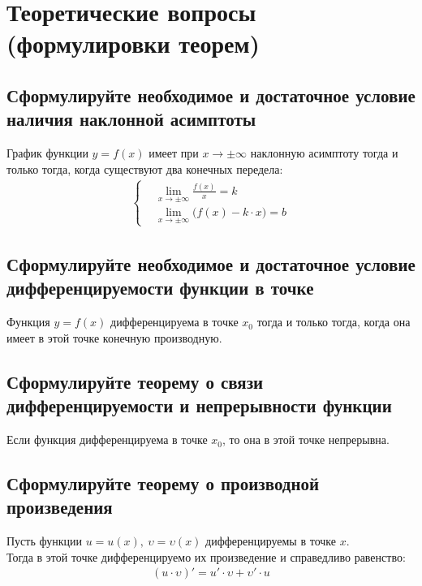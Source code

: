 \section{Теоретические вопросы (формулировки теорем)}

\subsection{Сформулируйте необходимое и достаточное условие наличия наклонной асимптоты}
\begin{theorem}
	График функции $y=f(x)$ имеет при $x\to \pm \infty$ наклонную асимптоту тогда и только тогда, когда существуют два конечных передела:
	\begin{gather*}
		\left\{ \begin{aligned}
			 & \lim\limits_{x \to \pm \infty} \frac{f(x)}{x} = k               \\
			 & \lim\limits_{x \to \pm \infty} \big(f(x) - k\cdot x\big) = b
		\end{aligned} \right.
	\end{gather*}
\end{theorem}

\newpage
\subsection{Сформулируйте необходимое и достаточное условие дифференцируемости функции в точке}
\begin{theorem}
	Функция $y=f(x)$ дифференцируема в точке $x_0$ тогда и только тогда, когда она имеет в этой точке конечную производную.
\end{theorem}

\subsection{Сформулируйте теорему о связи дифференцируемости и непрерывности функции}
\begin{theorem} 
	Если функция дифференцируема в точке $x_0$, то она в этой точке непрерывна.
\end{theorem}

\subsection{Сформулируйте теорему о производной произведения}
\begin{theorem}
	Пусть функции $u = u(x),\ \upsilon = \upsilon (x)$ дифференцируемы в точке $x$.\\
	Тогда в этой точке дифференцируемо их произведение и справедливо равенство:
	\begin{gather*}
		(u \cdot \upsilon)' = u'\cdot \upsilon + \upsilon' \cdot u
	\end{gather*}
\end{theorem}

